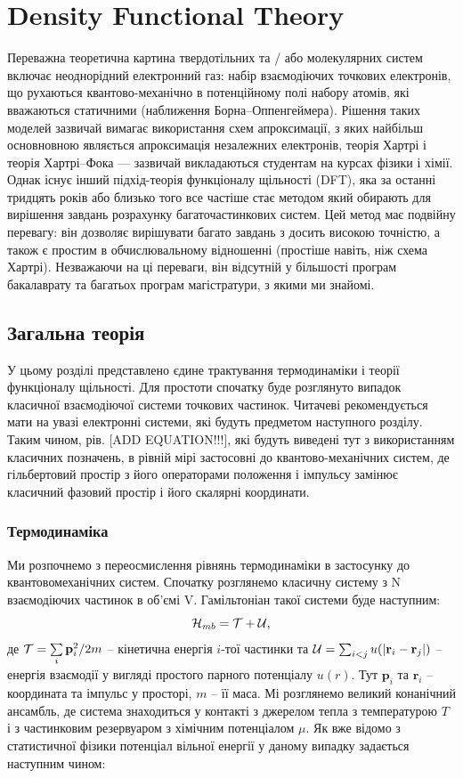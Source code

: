 \chapter{Density Functional Theory}
Переважна теоретична картина твердотільних та / або молекулярних систем включає неоднорідний електронний газ: набір взаємодіючих точкових електронів, що рухаються квантово-механічно в потенційному полі набору атомів, які вважаються статичними (наближення Борна–Оппенгеймера). Рішення таких моделей зазвичай вимагає використання схем апроксимації, з яких найбільш основновною являється апроксимація незалежних електронів, теорія Хартрі і теорія Хартрі–Фока — зазвичай викладаються студентам на курсах фізики і хімії. Однак існує інший підхід-теорія функціоналу щільності (DFT), яка за останні тридцять років або близько того все частіше стає методом який обирають для вирішення завдань розрахунку багаточастинкових систем. Цей метод має подвійну перевагу: він дозволяє вирішувати багато завдань з досить високою точністю, а також є простим в обчислювальному відношенні (простіше навіть, ніж схема Хартрі). Незважаючи на ці переваги, він відсутній у більшості програм бакалаврату та багатьох програм магістратури, з якими ми знайомі.
\section{Загальна теорія}
У цьому розділі представлено єдине трактування термодинаміки і теорії функціоналу щільності. Для простоти спочатку буде розглянуто випадок класичної взаємодіючої системи точкових частинок. Читачеві рекомендується мати на увазі електронні системи, які будуть предметом наступного розділу. Таким чином, рів. [ADD EQUATION!!!], які будуть виведені тут з використанням класичних позначень, в рівній мірі застосовні до квантово-механічних систем, де гільбертовий простір з його операторами положення і імпульсу замінює класичний фазовий простір і його скалярні координати.
\subsection{Термодинаміка}
Ми розпочнемо з переосмислення рівнянь термодинаміки в застосунку до квантовомеханічних систем. Спочатку розглянемо класичну систему з N взаємодіючих частинок в об'ємі V. Гамільтоніан такої системи буде наступним:
\begin{equation}
\label{eqn:Ham}
	{\cal H}_{mb} = {\cal T} + {\cal U},
\end{equation}
де ${\cal T} = \sum\limits_{i}\textbf{p}_i^2/2m$ -- кінетична енергія $i$-тої частинки та ${\cal U} = \sum_{i < j}u(|\textbf{r}_i - \textbf{r}_j|)$ -- енергія взаємодії у вигляді простого парного потенціалу $u(r)$. Тут $\textbf{p}_i$ та $\textbf{r}_i$ -- координата та імпульс у просторі, $m$ -- її маса. 
Мі розглянемо великий конанічний ансамбль, де система знаходиться у контакті з джерелом тепла з температурою $T$ і з частинковим резервуаром з хімічним потенціалом $\mu$. Як вже відомо з статистичної фізики потенціал вільної енергії у даному випадку задається наступним чином:

